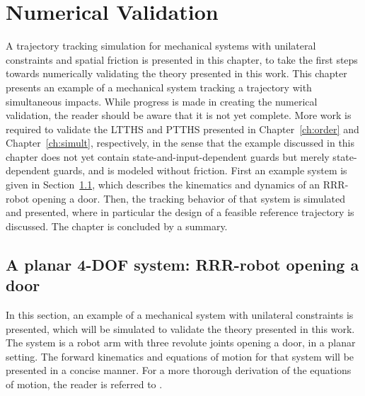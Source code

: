 \documentclass[../DC2019003Bouma.tex]{subfiles}
\begin{document}
\graphicspath{{04_Validation/img/}}
\renewcommand{\chaptermark}[1]{\markboth{\thechapter.\ #1}{}}
\renewcommand{\sectionmark}[1]{\markright{#1}{}}
\pagestyle{fancyreport}
\cleartooddpage
\pagestyle{fancyreport}
\chapter{Numerical Validation}\label{ch:vali}
A trajectory tracking simulation for mechanical systems with unilateral constraints and spatial friction is presented in this chapter, to take the first steps towards numerically validating the theory presented in this work. This chapter presents an example of a mechanical system tracking a trajectory with simultaneous impacts. While progress is made in creating the numerical validation, the reader should be aware that it is not yet complete. More work is required to validate the LTTHS and PTTHS presented in Chapter~\ref{ch:order} and Chapter~\ref{ch:simult}, respectively, in the sense that the example discussed in this chapter does not yet contain state-and-input-dependent guards but merely state-dependent guards, and is modeled without friction. First an example system is given in Section~\ref{sec:5sys}, which describes the kinematics and dynamics of an RRR-robot opening a door. Then, the tracking behavior of that system is simulated and presented, where in particular the design of a feasible reference trajectory is discussed. The chapter is concluded by a summary.

\section{A planar 4-DOF system: RRR-robot opening a door}\label{sec:5sys}
In this section, an example of a mechanical system with unilateral constraints is presented, which will be simulated to validate the theory presented in this work. The system is a robot arm with three revolute joints opening a door, in a planar setting. The forward kinematics and equations of motion for that system will be presented in a concise manner. For a more thorough derivation of the equations of motion, the reader is referred to \cite{Rijnen2018b}. 
\end{document}
